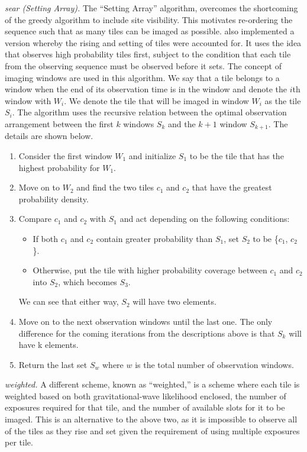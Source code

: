 \documentclass[twocolumn]{aastex62}
\begin{document}
\emph{sear (Setting Array).} The ``Setting Array'' algorithm, overcomes the shortcoming of the greedy algorithm to include site visibility. This motivates re-ordering the sequence such that as many tiles can be imaged as possible.
\cite{RaSi2017} also implemented a version whereby the rising and setting of tiles were accounted for. It uses the idea that observes high probability tiles first, subject to the condition that each tile from the observing sequence must be observed before it sets. The concept of imaging windows are used in this algorithm. We say that a tile belongs to a window when the end of its observation time is in the window and denote the $i$th window with $W_i$. We denote the tile that will be imaged in window $W_i$ as the tile $S_i$. The algorithm uses the recursive relation between the optimal observation arrangement between the first $k$ windows $S_k$ and the $k + 1$ window $S_{k+1}$. The details are shown below. 
\begin{enumerate}
\item Consider the first window $W_1$ and initialize $S_1$ to be the tile that has the highest probability for $W_1$.
\item Move on to $W_2$ and find the two tiles $c_1$ and $c_2$ that have the greatest probability density.
\item Compare $c_1$ and $c_2$ with $S_1$ and act depending on the following conditions:
\begin{itemize}
\item If both $c_1$ and $c_2$ contain greater probability than $S_1$, set $S_2$ to be \{$c_1$, $c_2$\}.
\item Otherwise, put the tile with higher probability coverage between $c_1$ and $c_2$ into $S_2$, which becomes $S_3$.
\end{itemize}
We can see that either way, $S_2$ will have two elements.
\item Move on to the next observation windows until the last one. The only difference for the coming iterations from the descriptions above is that $S_k$ will have k elements.
\item Return the last set $S_w$ where $w$ is the total number of observation windows.
\end{enumerate}

\emph{weighted.} A different scheme, known as ``weighted,'' is a scheme where each tile is weighted based on both gravitational-wave likelihood enclosed, the number of exposures required for that tile, and the number of available slots for it to be imaged. This is an alternative to the above two, as it is impossible to observe all of the tiles as they rise and set given the requirement of using multiple exposures per tile. 
\end{document}
